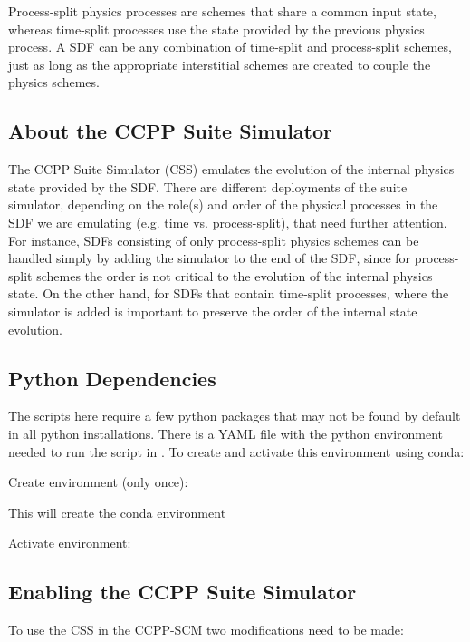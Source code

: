 Process-split physics processes are schemes that share a common input state, whereas time-split processes use the state provided by the previous physics process. A SDF can be any combination of time-split and process-split schemes, just as long as the appropriate interstitial schemes are created to couple the physics schemes.

\subsection{About the CCPP Suite Simulator}

The CCPP Suite Simulator (CSS) emulates the evolution of the internal physics state provided by the SDF. There are different deployments of the suite simulator, depending on the role(s) and order of the physical processes in the SDF we are emulating (e.g. time vs. process-split), that need further attention. For instance, SDFs consisting of only process-split physics schemes can be handled simply by adding the simulator to the end of the SDF, since for process-split schemes the order is not critical to the evolution of the internal physics state. On the other hand, for SDFs that contain time-split processes, where the simulator is added is important to preserve the order of the internal state evolution.

\subsection{Python Dependencies}
\label{subsection: pydepend}
The scripts here require a few python packages that may not be found by default in all python installations. There is a YAML file with the python environment needed to run the script in . To create and activate this environment using conda:

Create environment (only once):


This will create the conda environment 


Activate environment:


\subsection{Enabling the CCPP Suite Simulator}

To use the CSS in the CCPP-SCM two modifications need to be made:

